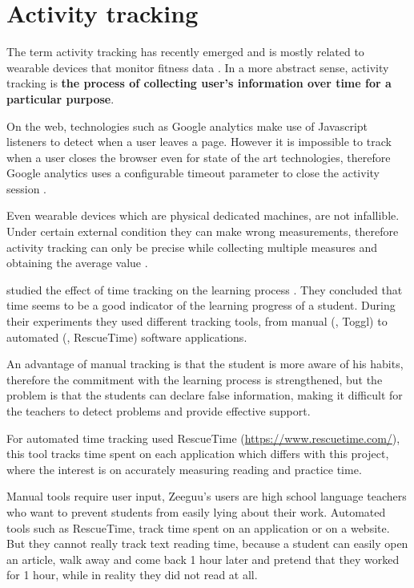 \section{Activity tracking}

The term activity tracking has recently emerged and is mostly related to wearable devices that monitor fitness data \cite{Wikipedia2016}. In a more abstract sense, activity tracking is \textbf{the process of collecting user's information over time for a particular purpose}. 

On the web, technologies such as Google analytics make use of Javascript listeners to detect when a user leaves a page. However it is impossible to track when a user closes the browser even for state of the art technologies, therefore Google analytics uses a configurable timeout parameter to close the activity session \cite{Pierstorff2014}.

Even wearable devices \cite{Evenson2015} which are physical dedicated machines, are not infallible. Under certain external condition they can make wrong measurements, therefore activity tracking can only be precise while collecting multiple measures and obtaining the average value \cite{El-Amrawy2015}.

\citeauthor{Santos2012} studied the effect of time tracking on the learning process \cite{Santos2012}. They concluded that time seems to be a good indicator of the learning progress of a student. During their experiments they used different tracking tools, from manual (\eg, Toggl) to automated (\eg, RescueTime) software applications. 

An advantage of manual tracking is that the student is more aware of his habits, therefore the commitment with the learning process is strengthened, but the problem is that the students can declare false information, making it difficult for the teachers to detect problems and provide effective support. 

For automated time tracking \citeauthor{Santos2012} used RescueTime (\url{https://www.rescuetime.com/}), this tool tracks time spent on each application which differs with this project, where the interest is on accurately measuring reading and practice time. 

Manual tools require user input, Zeeguu's users are high school language teachers who want to prevent students from easily lying about their work. Automated tools such as RescueTime, track time spent on an application or on a website. But they cannot really track text reading time, because a student can easily open an article, walk away and come back 1 hour later and pretend that they worked for 1 hour, while in reality they did not read at all. 

